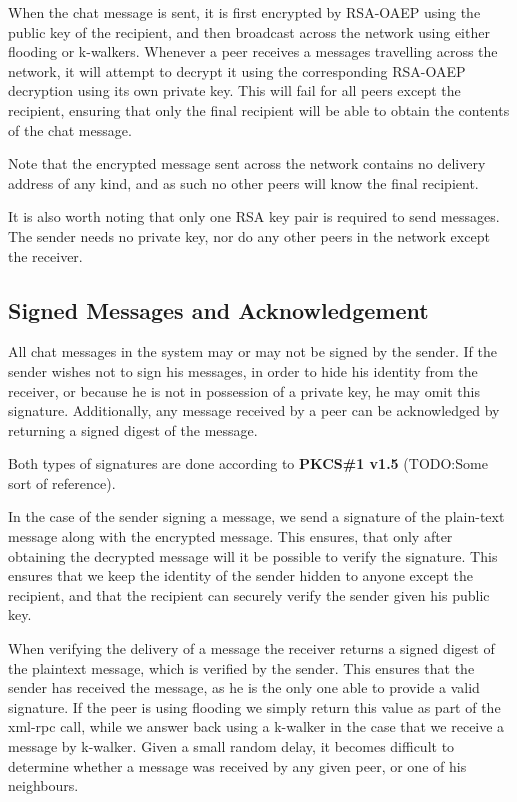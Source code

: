 When the chat message is sent, it is first encrypted by RSA-OAEP using the public key of the recipient, and then broadcast across the network using either flooding or k-walkers. Whenever a peer receives a messages travelling across the network, it will attempt to decrypt it using the corresponding RSA-OAEP decryption using its own private key. This will fail for all peers except the recipient, ensuring that only the final recipient will be able to obtain the contents of the chat message.

Note that the encrypted message sent across the network contains no delivery address of any kind, and as such no other peers will know the final recipient.

It is also worth noting that only one RSA key pair is required to send messages. The sender needs no private key, nor do any other peers in the network except the receiver.

\subsection{Signed Messages and Acknowledgement}

All chat messages in the system may or may not be signed by the sender. If the sender wishes not to sign his messages, in order to hide his identity from the receiver, or because he is not in possession of a private key, he may omit this signature. Additionally, any message received by a peer can be acknowledged by returning a signed digest of the message.

Both types of signatures are done according to \textbf{PKCS\#1 v1.5} (TODO:Some sort of reference).

In the case of the sender signing a message, we send a signature of the plain-text message along with the encrypted message. This ensures, that only after obtaining the decrypted message will it be possible to verify the signature. This ensures that we keep the identity of the sender hidden to anyone except the recipient, and that the recipient can securely verify the sender given his public key.

When verifying the delivery of a message the receiver returns a signed digest of the plaintext message, which is verified by the sender. This ensures that the sender has received the message, as he is the only one able to provide a valid signature. If the peer is using flooding we simply return this value as part of the xml-rpc call, while we answer back using a k-walker in the case that we receive a message by k-walker. Given a small random delay, it becomes difficult to determine whether a message was received by any given peer, or one of his neighbours. 

